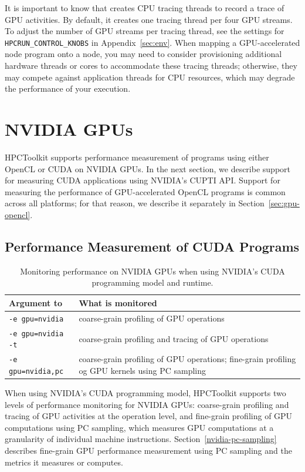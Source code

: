 It is important to know that \hpcrun{} creates CPU tracing threads to record a trace of GPU activities. By default, it creates one tracing thread per four GPU streams. To adjust the number of GPU streams per tracing thread, see the settings for {\tt HPCRUN\_CONTROL\_KNOBS} in Appendix~\ref{sec:env}.
When mapping a GPU-accelerated node program onto a node, you may need to consider provisioning additional hardware threads or cores to accommodate these tracing threads; otherwise, they may compete against  application threads for CPU resources, which  may degrade the performance of your execution.

\section{NVIDIA GPUs}

HPCToolkit supports performance measurement of programs using either OpenCL or CUDA on NVIDIA GPUs. In the next section, we describe support for measuring CUDA applications using NVIDIA's CUPTI API. Support for measuring the performance of GPU-accelerated OpenCL programs is common across all platforms; for that reason, we describe it separately in Section~\ref{sec:gpu-opencl}.

\subsection{Performance Measurement of CUDA Programs}
\label{sec:nvidia-gpu}

\begin{table}[t]
\centering
\begin{tabular}{|l|p{3.5in}|}\hline
Argument to \hpcrun{} & What is monitored\\\hline\hline
{\tt -e gpu=nvidia} & coarse-grain profiling of GPU operations\\\hline
{\tt -e gpu=nvidia -t} & coarse-grain profiling and tracing of GPU operations\\\hline
{\tt -e gpu=nvidia,pc} &  coarse-grain profiling of GPU operations; fine-grain profiling og GPU kernels using PC sampling\\\hline
\end{tabular}
\caption{Monitoring performance on NVIDIA GPUs when using NVIDIA's CUDA programming model and runtime.}
\label{nvidia-cuda-monitoring-options}
\end{table}

When using NVIDIA's CUDA programming model, HPCToolkit supports two levels of performance monitoring for NVIDIA GPUs: coarse-grain profiling and tracing of GPU activities at the operation level, and fine-grain profiling of GPU computations using PC sampling, which measures GPU computations at a granularity of individual machine instructions. Section~\ref{nvidia-pc-sampling} describes fine-grain GPU performance measurement using PC sampling and the metrics it measures or computes.

